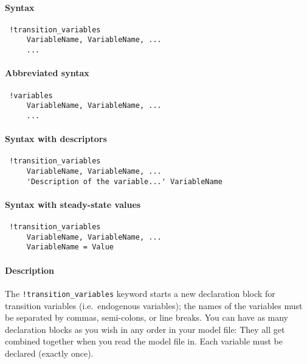 


	\paragraph{Syntax}
 
 \begin{verbatim}
 !transition_variables
     VariableName, VariableName, ...
     ...
 \end{verbatim}
 
 \paragraph{Abbreviated syntax}
 
 \begin{verbatim}
 !variables
     VariableName, VariableName, ...
     ...
 \end{verbatim}
 
 \paragraph{Syntax with descriptors}
 
 \begin{verbatim}
 !transition_variables
     VariableName, VariableName, ...
     'Description of the variable...' VariableName
 \end{verbatim}
 
 \paragraph{Syntax with steady-state values}
 
 \begin{verbatim}
 !transition_variables
     VariableName, VariableName, ...
     VariableName = Value
 \end{verbatim}
 
 \paragraph{Description}
 
 The \texttt{!transition\_variables} keyword starts a new declaration
 block for transition variables (i.e.~endogenous variables); the names of
 the variables must be separated by commas, semi-colons, or line breaks.
 You can have as many declaration blocks as you wish in any order in your
 model file: They all get combined together when you read the model file
 in. Each variable must be declared (exactly once).
 
